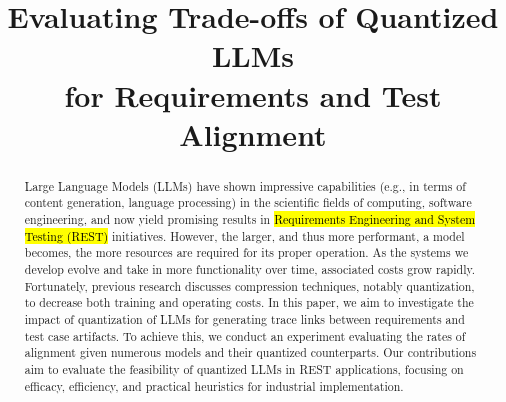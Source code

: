 \documentclass[conference]{IEEEtran}
\newcommand{\hly}[1]{\sethlcolor{yellow}\hl{#1}}
\begin{document}
\title{Evaluating Trade-offs of Quantized LLMs \\ for Requirements and Test Alignment}


\author{
  \and
  \and
}

\maketitle

\begin{abstract}
Large Language Models (LLMs) have shown impressive capabilities (e.g., in terms of content generation, language processing) in the scientific fields of computing, software engineering, and now yield promising results in \hly{Requirements Engineering and System Testing (REST)} initiatives. However, the larger, and thus more performant, a model becomes, the more resources are required for its proper operation. As the systems we develop evolve and take in more functionality over time, associated costs grow rapidly. Fortunately, previous research discusses compression techniques, notably quantization, to decrease both training and operating costs. In this paper, we aim to investigate the impact of quantization of LLMs for generating trace links between requirements and test case artifacts. To achieve this, we conduct an experiment evaluating the rates of alignment given numerous models and their quantized counterparts. Our contributions aim to evaluate the feasibility of quantized LLMs in REST applications, focusing on efficacy, efficiency, and practical heuristics for industrial implementation.
\end{abstract}
\end{document}
